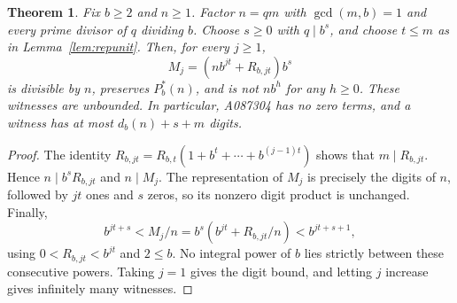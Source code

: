\documentclass[10pt]{article}
\newtheorem{theorem}{Theorem}
\newcommand{\Pz}{P^{\!*}}
\begin{document}
\begin{theorem}\label{thm:exist}
Fix $b\ge2$ and $n\ge1$. Factor $n=qm$ with $\gcd(m,b)=1$ and every
prime divisor of $q$ dividing $b$. Choose $s\ge0$ with $q\mid b^s$,
and choose $t\le m$ as in Lemma~\ref{lem:repunit}. Then, for every $j\ge1$,
\begin{equation}\label{eq:witness}
 M_j=(nb^{jt}+R_{b,jt})b^s
\end{equation}
is divisible by $n$, preserves $\Pz_b(n)$, and is not $nb^h$ for any
$h\ge0$. These witnesses are unbounded. In particular, A087304 has no
zero terms, and a witness has at most $d_b(n)+s+m$ digits.
\end{theorem}
\begin{proof}
The identity
$R_{b,jt}=R_{b,t}(1+b^t+\cdots+b^{(j-1)t})$ shows that
$m\mid R_{b,jt}$. Hence $n\mid b^sR_{b,jt}$ and $n\mid M_j$.
The representation of $M_j$ is precisely the digits of $n$, followed
by $jt$ ones and $s$ zeros, so its nonzero digit product is unchanged.
Finally,
\[
 b^{jt+s}<M_j/n=b^s(b^{jt}+R_{b,jt}/n)<b^{jt+s+1},
\]
using $0<R_{b,jt}<b^{jt}$ and $2\le b$. No integral power of $b$ lies
strictly between these consecutive powers. Taking $j=1$ gives the
digit bound, and letting $j$ increase gives infinitely many witnesses.
\end{proof}
\end{document}
